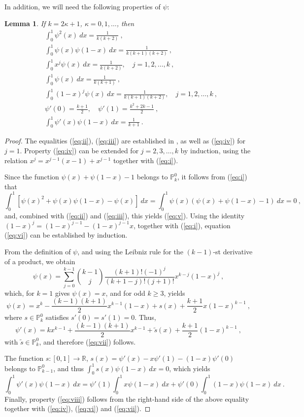 \documentclass{amsart}
\newtheorem{lemma}{Lemma}[section]
\begin{document}
In addition, we will need the following properties of $\psi$:
\begin{lemma}\label{lem:usefl}
If $k=2\kappa+1$, $\kappa=0,1,\dots$, then
\begin{align}
&\int_0^1 \psi^2(x)~dx=\frac{1}{k(k+2)}\ , \tag{i}\label{eq:ii} \\ 
&\int_0^1 \psi(x)\psi(1-x)~dx=\frac{1}{k(k+1)(k+2)}\ , \tag{ii}\label{eq:iii}\\
&\int_0^1 x^j\psi(x)~dx=\frac{1}{k(k+2)},\quad j=1,2,\dots, k\ , \tag{iii}\label{eq:iv}\\
&\int_0^1 \psi(x)~dx=\frac{1}{k(k+1)}\ , \tag{iv}\label{eq:v}\\
&\int_0^1 (1-x)^j\psi(x)~dx = \frac{1}{k(k+1)(k+2)},\quad j=1,2,\dots, k\ , \tag{v}\label{eq:vi}\\
&\psi'(0)=\frac{k+1}{2},\quad \psi'(1)=\frac{k^2+2k-1}{2}\ ,\tag{vi}\label{eq:vii}\\
& \int_0^1 \psi'(x)\psi(1-x)~dx=\frac{1}{k+1}\ .\tag{vii}\label{eq:viii}
\end{align}
\end{lemma}
\begin{proof}
The equalities (\ref{eq:ii}), (\ref{eq:iii}) are established in \cite{CT1987}, as well as (\ref{eq:iv}) for $j=1$. Property (\ref{eq:iv}) can be extended for $j=2,3,\dots, k$ by induction, using the relation $x^j=x^{j-1}(x-1)+x^{j-1}$ together with (\ref{eq:i}). 

Since the function $\psi(x)+\psi(1-x)-1$ belongs to $\mathbb{P}_k^0$, it follows from (\ref{eq:i}) that
$$\int_0^1 [\psi(x)^2+\psi(x)\psi(1-x)-\psi(x)]~dx=\int_0^1 \psi(x)(\psi(x)+\psi(1-x)-1)~dx=0\ ,$$
and, combined with (\ref{eq:ii}) and (\ref{eq:iii}), this yields (\ref{eq:v}).
Using the identity $(1-x)^j=(1-x)^{j-1}-(1-x)^{j-1}x$, together with (\ref{eq:i}), equation (\ref{eq:vi}) can be established by induction. 

From the definition of $\psi$, and using the Leibniz rule for the $(k-1)$-st derivative of a product, we obtain
$$\psi(x)=\sum_{j=0}^{k-1}{{k-1}\choose{j}}\frac{(k+1)!(-1)^j}{(k+1-j)!(j+1)!}x^{k-j}(1-x)^j\ ,$$
which, for $k=1$ gives $\psi(x)=x$, and for odd $k\geq 3$, yields
$$\psi(x)=x^k-\frac{(k-1)(k+1)}{2}x^{k-1}(1-x)+s(x)+\frac{k+1}{2}x(1-x)^{k-1}\ ,$$
where $s\in \mathbb{P}_k^0$ satisfies $s'(0)=s'(1)=0$. Thus,
$$\psi'(x)=kx^{k-1}+\frac{(k-1)(k+1)}{2}x^{k-1}+\widetilde{s}(x)+\frac{k+1}{2}(1-x)^{k-1}\ ,$$
with $\widetilde{s}\in \mathbb{P}_k^0$, and therefore (\ref{eq:vii}) follows.

The function $s:[0,1]\to \mathbb{R}$, $s(x)=\psi'(x)-x\psi'(1)-(1-x)\psi'(0)$ belongs to $\mathbb{P}_{k-1}^0$, and thus
$\int_0^1 s(x)\psi(1-x)~dx=0$,
which yields
$$\int_0^1 \psi'(x)\psi(1-x)~dx=\psi'(1)\int_0^1 x\psi(1-x)~dx+\psi'(0)\int_0^1(1-x)\psi(1-x)~dx\ .$$
Finally, property (\ref{eq:viii}) follows from the right-hand side of the above equality together with (\ref{eq:iv}), (\ref{eq:vi}) and (\ref{eq:vii}).
\end{proof}
\end{document}
